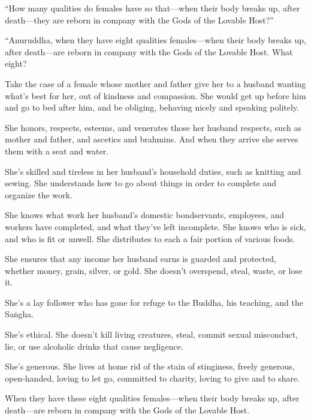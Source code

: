 \documentclass[12pt,openany]{book}%
\begin{document}
“How many qualities do females have so that—when their body breaks up, after death—they are reborn in company with the Gods of the Lovable Host?” 

“Anuruddha, when they have eight qualities females—when their body breaks up, after death—are reborn in company with the Gods of the Lovable Host. What eight? 

Take the case of a female whose mother and father give her to a husband wanting what’s best for her, out of kindness and compassion. She would get up before him and go to bed after him, and be obliging, behaving nicely and speaking politely. 

She honors, respects, esteems, and venerates those her husband respects, such as mother and father, and ascetics and brahmins. And when they arrive she serves them with a seat and water. 

She’s skilled and tireless in her husband’s household duties, such as knitting and sewing. She understands how to go about things in order to complete and organize the work. 

She knows what work her husband’s domestic bondservants, employees, and workers have completed, and what they’ve left incomplete. She knows who is sick, and who is fit or unwell. She distributes to each a fair portion of various foods. 

She ensures that any income her husband earns is guarded and protected, whether money, grain, silver, or gold. She doesn’t overspend, steal, waste, or lose it. 

She’s a lay follower who has gone for refuge to the Buddha, his teaching, and the \textsanskrit{Saṅgha}. 

She’s ethical. She doesn’t kill living creatures, steal, commit sexual misconduct, lie, or use alcoholic drinks that cause negligence. 

She’s generous. She lives at home rid of the stain of stinginess, freely generous, open-handed, loving to let go, committed to charity, loving to give and to share. 

When they have these eight qualities females—when their body breaks up, after death—are reborn in company with the Gods of the Lovable Host. 
\end{document}
